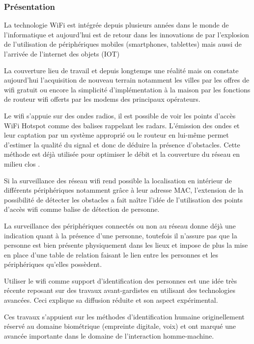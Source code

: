 \documentclass[conference,compsoc]{IEEEtran}
\begin{document}
\subsubsection{Présentation}

La technologie WiFi est intégrée depuis plusieurs années dans le monde de l'informatique et aujourd'hui est de retour dans les innovations de par l'explosion de l'utilisation de périphériques mobiles (smartphones, tablettes) mais aussi de l'arrivée de l'internet des objets (IOT) \cite{wifialliance}

La couverture lieu de travail et depuis longtemps une réalité mais on constate aujourd'hui l'acquisition de nouveau terrain notamment les villes par les offres de wifi gratuit ou encore la simplicité d'implémentation à la maison par les fonctions de routeur wifi offerts par les modems des principaux opérateurs.

Le wifi s'appuie sur des ondes radios, il est possible de voir les points d'accès WiFi Hotspot comme des balises rappelant les radars. L'émission des ondes et leur captation par un système approprié ou le routeur en lui-même permet d'estimer la qualité du signal et donc de déduire la présence d'obstacles. Cette méthode est déjà utilisée pour optimiser le débit et la couverture du réseau en milieu clos \cite{1611.02049v1}.

Si la surveillance des réseau wifi rend possible la localisation en intérieur de différents périphériques notamment grâce à leur adresse MAC, l'extension de la possibilité de détecter les obstacles a fait naître l'idée de l'utilisation des points d'accès wifi comme balise de détection de personne. 

La surveillance des périphériques connectés ou non au réseau donne déjà une indication quant à la présence d'une personne, toutefois il n'assure pas que la personne est bien présente physiquement dans les lieux et impose de plus la mise en place d'une table de relation faisant le lien entre les personnes et les périphériques qu'elles possèdent.

Utiliser le wifi comme support d'identification des personnes est une idée très récente reposant sur des travaux avant-gardistes en utilisant des technologies avancées. Ceci explique sa diffusion réduite et son aspect expérimental. 

Ces travaux s'appuient sur les méthodes d'identification humaine originellement réservé au domaine biométrique (empreinte digitale, voix) et ont marqué une avancée importante dans le domaine de l'interaction homme-machine. \cite{1608.03430}
\end{document}
